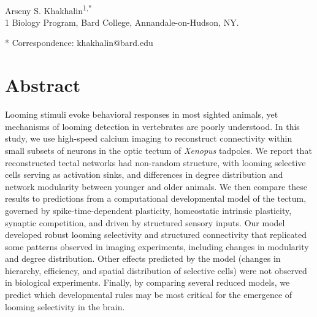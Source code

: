 \documentclass{article}
\begin{document}



\begin{flushleft}
{\Large
\textbf{}
}
\newline
\\
Arseny S. Khakhalin\textsuperscript{1,*}
\\
\bigskip
{1} Biology Program, Bard College, Annandale-on-Hudson, NY. 

* Correspondence: khakhalin@bard.edu






\section*{Abstract}
Looming stimuli evoke behavioral responses in most sighted animals, yet mechanisms of looming detection in vertebrates are poorly understood. In this study, we use high-speed calcium imaging to reconstruct connectivity within small subsets of neurons in the optic tectum of \textit{Xenopus} tadpoles. We report that reconstructed tectal networks had non-random structure, with looming selective cells serving as activation sinks, and differences in degree distribution and network modularity between younger and older animals. We then compare these results to predictions from a computational developmental model of the tectum, governed by spike-time-dependent plasticity, homeostatic intrinsic plasticity, synaptic competition, and driven by structured sensory inputs. Our model developed robust looming selectivity and structured connectivity that replicated some patterns observed in imaging experiments, including changes in modularity and degree distribution. Other effects predicted by the model (changes in hierarchy, efficiency, and spatial distribution of selective cells) were not observed in biological experiments. Finally, by comparing several reduced models, we predict which developmental rules may be most critical for the emergence of looming selectivity in the brain.
\bigskip

\end{flushleft} %
\end{document}
